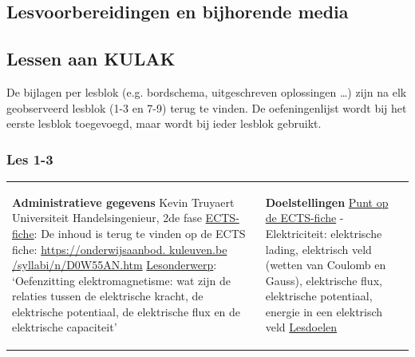 


\begin{landscape}
	\section{Lesvoorbereidingen en bijhorende media}
	\subsection{Lessen aan KULAK}
	De bijlagen per lesblok (e.g. bordschema, uitgeschreven oplossingen \ldots) zijn na elk geobserveerd lesblok (1-3 en 7-9) terug te vinden. De oefeningenlijst wordt bij het eerste lesblok toegevoegd, maar wordt bij ieder lesblok gebruikt.
	\subsubsection{Les 1-3}
	\begin{tabularx}{1.56\textwidth}{|p{}|X|}\hline
		\textbf{Administratieve gegevens}\newline\newline
		Kevin Truyaert\newline\newline
		Universiteit\newline
		Handelsingenieur, 2de fase\newline
		\underline{ECTS-fiche}: De inhoud is terug te vinden op de ECTS fiche: \href{https://onderwijsaanbod.kuleuven.be/syllabi/n/D0W55AN.htm}{https://onderwijsaanbod. kuleuven.be /syllabi/n/D0W55AN.htm} \newline
		\underline{Lesonderwerp}: `Oefenzitting elektromagnetisme: wat zijn de relaties tussen de elektrische kracht, de  elektrische potentiaal, de elektrische flux en de elektrische capaciteit' & \textbf{Doelstellingen}\newline\vspace{0.5cm}
		\underline{Punt op de ECTS-fiche}
		\vspace{-0.5cm}\newline  - Elektriciteit: elektrische lading, elektrisch veld (wetten van Coulomb en Gauss), elektrische flux, elektrische potentiaal, energie in een elektrisch veld \newline
		\underline{Lesdoelen}\newline
		\vspace{-0.75cm}
		\begin{enumerate}[itemsep=0.08\baselineskip]

\end{enumerate}
\end{tabularx}
\end{landscape}
